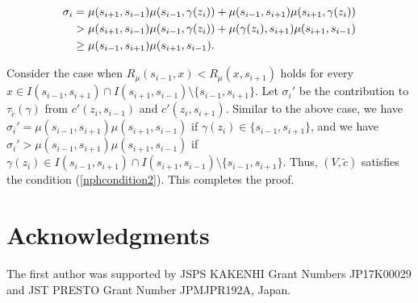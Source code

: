\documentclass[11pt]{article}
\theoremstyle{definition}
\begin{document}
\begin{align}
    \sigma_i&=\mu(s_{i+1},s_{i-1})\mu(s_{i-1},\gamma(z_i))+\mu(s_{i-1},s_{i+1})\mu(s_{i+1},\gamma(z_i))\notag\\
    &>\mu(s_{i+1},s_{i-1})\mu(s_{i-1},\gamma(z_i))+\mu(\gamma(z_i),s_{i+1})\mu(s_{i+1},s_{i-1})\notag\\
    &\geq \mu(s_{i-1},s_{i+1})\mu(s_{i+1},s_{i-1}). 
\end{align}

Consider the case when $R_{\mu}(s_{i-1},x)<R_{\mu}(x,s_{i+1})$ holds for every $x\in I(s_{i-1},s_{i+1})\cap I(s_{i+1},s_{i-1})\setminus \{s_{i-1},s_{i+1}\}$. Let $\sigma_i'$ be the contribution to $\tau_{\tilde{c}}(\gamma)$ from $c'(z_i,s_{i-1})$ and $c'(z_i,s_{i+1})$. Similar to the above case, we have $\sigma_i'=\mu(s_{i-1},s_{i+1})\mu(s_{i+1},s_{i-1})$ if $\gamma(z_i)\in \{s_{i-1},s_{i+1}\}$, and we have $\sigma_i'>\mu(s_{i-1},s_{i+1})\mu(s_{i+1},s_{i-1})$ if $\gamma(z_i)\in I(s_{i-1},s_{i+1})\cap I(s_{i+1},s_{i-1})\setminus \{s_{i-1},s_{i+1}\}$. Thus, $(V,\tilde{c})$ satisfies the condition (\ref{nphcondition2}). This completes the proof.

\section*{Acknowledgments}
The first author was supported by JSPS KAKENHI Grant Numbers JP17K00029
and JST PRESTO Grant Number JPMJPR192A, Japan.



\end{document}
